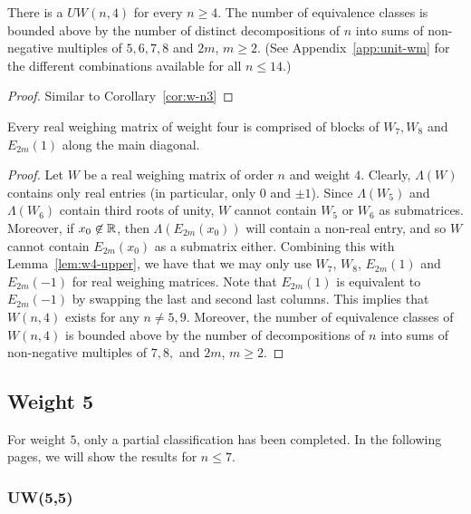 \begin{corollary} \label{cor:w-n4}
 There is a $UW(n,4)$ for every $n \geq 4$. The number of equivalence classes  is bounded above by the number of distinct decompositions of $n$ into sums of non-negative multiples of $5,6,7,8$ and $2m$, $m \geq 2$. (See Appendix~\ref{app:unit-wm} for the different combinations available for all $n \leq 14$.)
 \begin{proof}
  Similar to Corollary~\ref{cor:w-n3}
 \end{proof}

\end{corollary}

\begin{corollary} \label{cor:w-4-count}
 Every real weighing matrix of weight four is comprised of blocks of $W_7,W_8$ and $E_{2m}(1)$ along the main diagonal.
 \begin{proof}
  {Let $W$ be a real weighing matrix of order $n$ and weight $4$. Clearly, $\Lambda(W)$ contains only real entries (in particular, only $0$ and $\pm 1$). Since $\Lambda(W_5)$ and $\Lambda(W_6)$ contain third roots of unity, $W$ cannot contain $W_5$ or $W_6$ as submatrices. Moreover, if $x_0 \not\in \mathbb{R}$, then $\Lambda\left(E_{2m}(x_0)\right)$ will contain a non-real entry, and so $W$ cannot contain $E_{2m}(x_0)$ as a submatrix either. Combining this with Lemma~\ref{lem:w4-upper}, we have that we may only use $W_7$, $W_8$, $E_{2m}(1)$ and $E_{2m}(-1)$ for real weighing matrices. Note that $E_{2m}(1)$ is equivalent to $E_{2m}(-1)$ by swapping the last and second last columns. This implies that $W(n,4)$ exists for any $n\neq5,9$. Moreover, the number of equivalence classes of $W(n,4)$ is bounded above by the number of decompositions of $n$ into sums of non-negative multiples of $7,8,$ and $2m$, $m \geq 2$.}
 \end{proof}
\end{corollary}

\subsection{Weight 5}
\label{subsec:w5}

For weight $5$, only a partial classification has been completed. In the following pages, we will show the results for $n \leq 7$.

\subsubsection{UW(5,5)}

